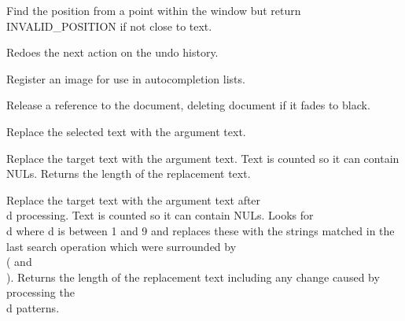 \label{wxstyledtextctrlpositionfrompointclose}


Find the position from a point within the window but return
INVALID\_POSITION if not close to text.


\label{wxstyledtextctrlredo}


Redoes the next action on the undo history.


\label{wxstyledtextctrlregisterimage}


Register an image for use in autocompletion lists.


\label{wxstyledtextctrlreleasedocument}


Release a reference to the document, deleting document if it fades to black.


\label{wxstyledtextctrlreplaceselection}


Replace the selected text with the argument text.


\label{wxstyledtextctrlreplacetarget}


Replace the target text with the argument text.
Text is counted so it can contain NULs.
Returns the length of the replacement text.


\label{wxstyledtextctrlreplacetargetre}


Replace the target text with the argument text after \\d processing.
Text is counted so it can contain NULs.
Looks for \\d where d is between 1 and 9 and replaces these with the strings
matched in the last search operation which were surrounded by \\( and \\).
Returns the length of the replacement text including any change
caused by processing the \\d patterns.


